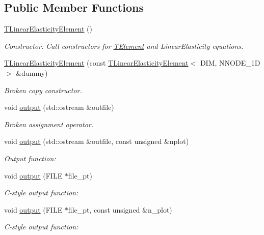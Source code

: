 \subsection*{Public Member Functions}
\begin{DoxyCompactItemize}
\item 
\hyperlink{classoomph_1_1TLinearElasticityElement_aebc7da4cf8438d0eb792f9338c6b664a}{T\+Linear\+Elasticity\+Element} ()
\begin{DoxyCompactList}\small\item\em Constructor\+: Call constructors for \hyperlink{classoomph_1_1TElement}{T\+Element} and Linear\+Elasticity equations. \end{DoxyCompactList}\item 
\hyperlink{classoomph_1_1TLinearElasticityElement_a20c742e8456b3f7b568131bd0ef54b96}{T\+Linear\+Elasticity\+Element} (const \hyperlink{classoomph_1_1TLinearElasticityElement}{T\+Linear\+Elasticity\+Element}$<$ D\+IM, N\+N\+O\+D\+E\+\_\+1D $>$ \&dummy)
\begin{DoxyCompactList}\small\item\em Broken copy constructor. \end{DoxyCompactList}\item 
void \hyperlink{classoomph_1_1TLinearElasticityElement_a76af9620bf824adfd6bef204af7a8f81}{output} (std\+::ostream \&outfile)
\begin{DoxyCompactList}\small\item\em Broken assignment operator. \end{DoxyCompactList}\item 
void \hyperlink{classoomph_1_1TLinearElasticityElement_acb51af6914538bf87852b892dc516ec0}{output} (std\+::ostream \&outfile, const unsigned \&nplot)
\begin{DoxyCompactList}\small\item\em Output function\+: \end{DoxyCompactList}\item 
void \hyperlink{classoomph_1_1TLinearElasticityElement_adc8c188c039e833bfab31aa3b127b3f7}{output} (F\+I\+LE $\ast$file\+\_\+pt)
\begin{DoxyCompactList}\small\item\em C-\/style output function\+: \end{DoxyCompactList}\item 
void \hyperlink{classoomph_1_1TLinearElasticityElement_ab819534efce64389b6e06bc90acefc86}{output} (F\+I\+LE $\ast$file\+\_\+pt, const unsigned \&n\+\_\+plot)
\begin{DoxyCompactList}\small\item\em C-\/style output function\+: \end{DoxyCompactList}\item 

\end{DoxyCompactItemize}
